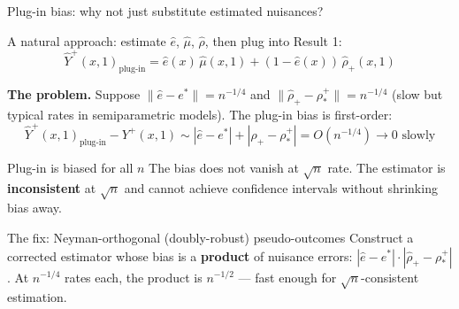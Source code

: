 \documentclass[aspectratio=169]{beamer}
\begin{document}
\begin{frame}{Plug-in bias: why not just substitute estimated nuisances?}

A natural approach: estimate $\hat e$, $\hat\mu$, $\hat\rho$, then plug into Result 1:
\[
  \hat Y^+(x,1)_\text{plug-in} = \hat e(x)\,\hat\mu(x,1) + (1-\hat e(x))\,\hat\rho_+(x,1)
\]

\smallskip
\textbf{The problem.} Suppose $\|\hat e - e^*\| = n^{-1/4}$ and $\|\hat\rho_+ - \rho^+_*\| = n^{-1/4}$ (slow but typical rates in semiparametric models). The plug-in bias is first-order:
\[
  \hat Y^+(x,1)_\text{plug-in} - Y^+(x,1) \sim |\hat e - e^*| + |\hat\rho_+ - \rho^+_*| = O(n^{-1/4}) \to 0 \text{ slowly}
\]

\smallskip
\begin{alertblock}{Plug-in is biased for all $n$}
The bias does not vanish at $\sqrt{n}$ rate. The estimator is \textbf{inconsistent} at $\sqrt{n}$ and cannot achieve confidence intervals without shrinking bias away.
\end{alertblock}

\smallskip
\begin{block}{The fix: Neyman-orthogonal (doubly-robust) pseudo-outcomes}
Construct a corrected estimator whose bias is a \textbf{product} of nuisance errors: $|\hat e - e^*|\cdot|\hat\rho_+ - \rho^+_*|$. At $n^{-1/4}$ rates each, the product is $n^{-1/2}$ --- fast enough for $\sqrt{n}$-consistent estimation.
\end{block}
\end{frame}

\end{document}
